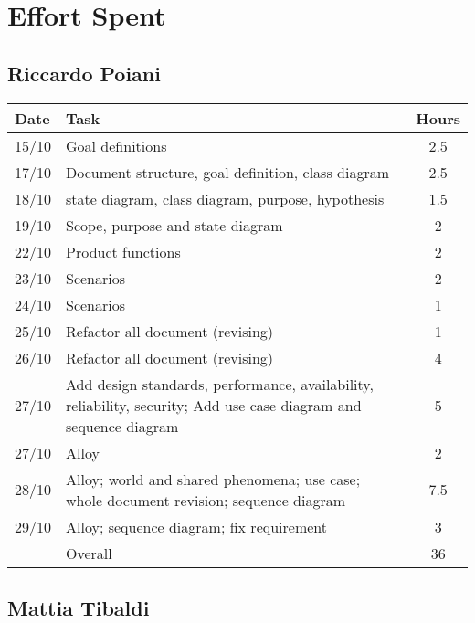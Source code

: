 \section{Effort Spent}

\subsection{Riccardo Poiani}

\begin{table}[H]
\begin{tabularx}{\textwidth}{|l|X|c|}
\hline
\rowcolor[HTML]{C0C0C0} 
Date & Task & Hours\\ \hline
15/10 & Goal definitions & 2.5\\ \hline
17/10 & Document structure, goal definition, class diagram & 2.5\\ \hline
18/10 & state diagram, class diagram, purpose, hypothesis & 1.5\\ \hline
19/10 & Scope, purpose and state diagram & 2\\ \hline
22/10 & Product functions & 2\\ \hline
23/10 & Scenarios & 2\\ \hline
24/10 & Scenarios & 1\\ \hline
25/10 & Refactor all document (revising) & 1\\ \hline
26/10 & Refactor all document (revising) & 4\\ \hline
27/10 & Add design standards, performance, availability, reliability, security; Add use case diagram and sequence diagram & 5\\ \hline
27/10 & Alloy & 2\\ \hline
28/10 & Alloy; world and shared phenomena; use case; whole document revision; sequence diagram & 7.5  \\ \hline
29/10 & Alloy; sequence diagram; fix requirement& 3 \\ \hline
\rowcolor[HTML]{C0C0C0} 
& Overall & 36 \\ \hline
\end{tabularx}
\end{table}

\subsection{Mattia Tibaldi}

